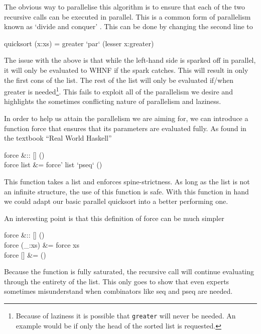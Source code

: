 The obvious way to parallelise this algorithm is to ensure that each of the two
recursive calls can be executed in parallel. This is a common form of
parallelism known as `divide and conquer' \citep{skeletons}.  This can be done
by changing the second line to

\begin{haskell}
quicksort (x:xs) = greater `par` (lesser \hsapp x:greater)
\end{haskell}

The issue with the above is that while the left-hand side is sparked off in
parallel, it will only be evaluated to WHNF if the spark catches. This will
result in only the first \<cons\> of the list. The rest of the list will
only be evaluated if/when \<greater\> is needed\footnote{Because of
laziness it is possible that \texttt{greater} will never be needed. An
example would be if only the head of the sorted list is requested.}. This
fails to exploit all of the parallelism we desire and highlights the sometimes
conflicting nature of parallelism and laziness.

    In order to help us attain the parallelism we are aiming for, we can
introduce a function \<force\> that ensures that its parameters are evaluated
fully. As found in the textbook ``Real World Haskell'' \citep{realWorld}

\begin{haskell}
force &:: [\hasalpha] \to ()\\
force list &= force' list `pseq` ()
\end{haskell}

This function takes a list and enforces spine-strictness. As long as the list is
not an infinite structure, the use of this function is safe. With this function
in hand we could adapt our basic parallel \<quicksort\> into a better performing one.

An interesting point is that this definition of \<force\> can be much simpler

\pagebreak

\begin{haskell}
force &:: [\hasalpha] \to () \\
force (\_:xs) &= force xs\\
force []           &= ()
\end{haskell}

Because the function is fully saturated, the recursive call will continue
evaluating through the entirety of the list. This only goes to show that even
experts sometimes misunderstand when combinators like \<seq\> and \<pseq\> are
needed.

